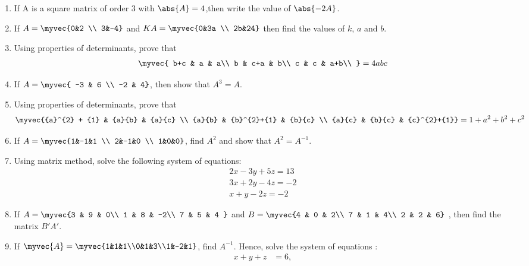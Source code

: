 \begin{enumerate}
 \item If A is a square matrix of order 3 with  $\abs{A}=4$,then write the value of $\abs{-2A}$.
 \item If $A = \myvec{0&2 \\ 3&-4}$ and $KA = \myvec{0&3a \\ 2b&24}$ then find the values of $k$, $a$ and $b$.
\item Using properties of determinants, prove that
   \begin{align*}
      \myvec{
        b+c & a & a\\
        b & c+a & b\\
        c & c & a+b\\
    } 
    =4abc 
   \end{align*} 
\item If $A=\myvec{ -3 & 6 \\ -2 & 4}$, then show that ${A}^3=A$.
\item Using properties of determinants, prove that \begin{align*}
\myvec{{a}^{2} + {1} & {a}{b} & {a}{c} \\ {a}{b} & {b}^{2}+{1} & {b}{c} \\ {a}{c} & {b}{c} & {c}^{2}+{1}} = 1+{a}^{2}+{b}^{2}+{c}^{2} \end{align*}
\item If $A=\myvec{1&-1&1 \\ 2&-1&0 \\ 1&0&0}$, find ${A}^2$ and show that ${A}^2 = A^{-1}$.
\item Using matrix method, solve the following system of equations: \begin{align*}
  2{x}-3{y}+5{z}=13 \\  3{x}+2{y}-4{z}=-2 \\
  {x}+{y}-2{z}=-2
 \end{align*}
\item  If $ A  = \myvec{3 & 9 & 0\\ 1 & 8 & -2\\ 7 & 5 & 4 } $ and $ B  = \myvec{4 & 0 & 2\\ 7 & 1 & 4\\ 2 & 2 & 6} $ , then find the matrix $ B'A'$.
\item If $\myvec {A} = \myvec{1&1&1\\0&1&3\\1&-2&1}$, find $A^{-1}$.
Hence, solve the system of equations :
\begin{align*}
    x+y+z&=6 ,\\

\end{align*}
\end{enumerate}
